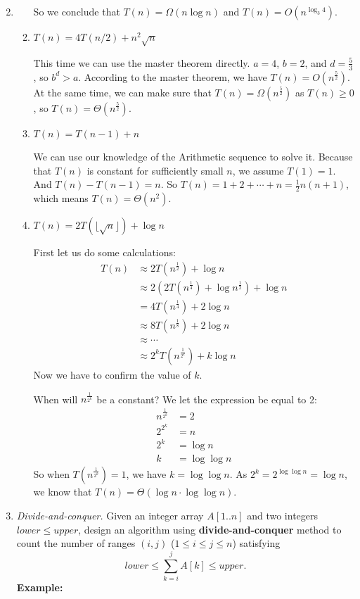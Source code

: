 \documentclass[12pt,a4paper]{article}
\makeatletter
\newtheorem*{solution}{Solution}
\theoremstyle{definition}
\renewenvironment{solution}[1][Solution] {\par\pushQED{\qed}\normalfont\topsep6\p@\@plus6\p@\relax\trivlist\item[\hskip\labelsep\bfseries#1\@addpunct{.}]\ignorespaces}{\popQED\endtrivlist\@endpefalse} \makeatother
\makeatother
\begin{document}
\begin{enumerate}
\begin{solution}
\begin{enumerate}
	So we conclude that $T(n)= \Omega(n\log n)$ and $T(n) = O(n^{\log_3 4})$.\\
	
	\item $T(n)=4 T(n / 2)+n^{2} \sqrt{n}$
	
	This time we can use the master theorem directly. $a=4$, $b=2$, and $d= \frac{5}{3}$, so $b^d>a$. According to the master theorem, we have $T(n) = O(n^{\frac{5}{2}})$. At the same time, we can make sure that $T(n) = \Omega(n^{\frac{5}{2}})$ as  $T(n)\geqslant0$, so $T(n) = \Theta(n^{\frac{5}{2}})$.\\
	
	\item $T(n)=T(n-1)+n$	
	
	We can use our knowledge of the Arithmetic sequence to solve it. Because that $T(n)$ is constant for sufficiently small $n$, we assume $T(1) = 1$. And $T(n) - T(n-1) = n$. So $T(n) = 1+2+\cdots+n=\frac{1}{2}n(n+1)$, which means $T(n) =\Theta(n^2)$.\\
	
	\item $T(n)=2T(\lfloor \sqrt n\rfloor)+\log n$
	
	First let us do some calculations:
	\begin{align*}
	T(n)&\approx 2T(n^{\frac{1}{2}})+\log n\\
	&\approx2(2T(n^{\frac{1}{4}})+\log n^{\frac{1}{2}})+\log n\\
	&=4T(n^{\frac{1}{4}})+2 \log n\\
	&\approx 8T(n^{\frac{1}{8}})+2\log n\\
	&\approx \cdots\\
	&\approx 2^kT(n^{\frac{1}{2^k}})+k\log n
	\end{align*}
	Now we have to confirm the value of $k$. 
	
	When will $n^{\frac{1}{2^k}}$ be a constant? We let the expression be equal to 2:
	\begin{align*}
	n^{\frac{1}{2^k}} &= 2\\
	2^{2^{k}} &= n\\
	2^k &= \log n\\
	k &= \log \log n
	\end{align*}
	So when $T(n^{\frac{1}{2^k}}) = 1$, we have $k = \log \log n$. As $2^k = 2^{\log \log n} = \log n$, we know that $T(n) = \Theta(\log n \cdot \log \log n)$.
    \end{enumerate}
\end{solution}
\item
\textit{Divide-and-conquer.} Given an integer array $A[1..n]$ and two integers $lower \le upper$, design an algorithm using \textbf{divide-and-conquer} method to count the number of ranges $(i,j)$ ($1 \leq i \leq j \leq n$) satisfying
$$
    lower \leq \sum_{k=i}^{j}{A[k]} \leq upper.
$$
\textbf{Example:}


\end{enumerate}
\end{document}
